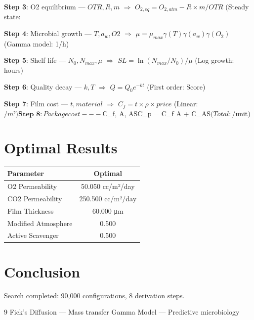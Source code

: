 \documentclass[11pt,twocolumn]{article}
\begin{document}
\textbf{Step 3}: O2 equilibrium --- $OTR, R, m$ $\Rightarrow$ $O_{2,eq} = O_{2,atm} - R \times m / OTR$ (Steady state: %


\textbf{Step 4}: Microbial growth --- $T, a_w, O2$ $\Rightarrow$ $\mu = \mu_{max} \gamma(T) \gamma(a_w) \gamma(O_2)$ (Gamma model: 1/h)


\textbf{Step 5}: Shelf life --- $N_0, N_{max}, \mu$ $\Rightarrow$ $SL = \ln(N_{max}/N_0)/\mu$ (Log growth: hours)


\textbf{Step 6}: Quality decay --- $k, T$ $\Rightarrow$ $Q = Q_0 e^{-kt}$ (First order: Score)


\textbf{Step 7}: Film cost --- $t, material$ $\Rightarrow$ $C_f = t \times \rho \times price$ (Linear: $/m²)


\textbf{Step 8}: Package cost --- $C_f, A, AS$ $\Rightarrow$ $C_p = C_f \times A + C_{AS}$ (Total: $/unit)


\section{Optimal Results}
\begin{table}[h]
\centering
\begin{tabular}{@{}lc@{}}
\toprule
Parameter & Optimal \\
\midrule
O2 Permeability & 50.050 cc/m²/day \\
CO2 Permeability & 250.500 cc/m²/day \\
Film Thickness & 60.000 μm \\
Modified Atmosphere & 0.500  \\
Active Scavenger & 0.500  \\
\bottomrule
\end{tabular}
\end{table}

\section{Conclusion}
Search completed: 90,000 configurations, 8 derivation steps.

\begin{thebibliography}{9}
 Fick's Diffusion --- Mass transfer
 Gamma Model --- Predictive microbiology
\end{thebibliography}
\end{document}
